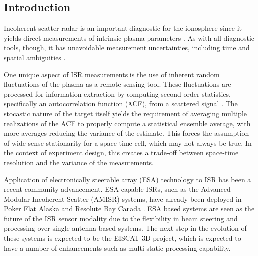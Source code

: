 \documentclass[draft,ras]{agutex}
\begin{document}
%
%

%

\begin{article}

\section{Introduction}
Incoherent scatter radar is an important diagnostic for the ionosphere since it yields direct measurements of intrinsic plasma parameters  \citep{dougherty:farley1960, farleydougherty:ISR2, doughteryfarley:ISR3, hagfors1961}. As with all diagnostic tools, though, it has unavoidable measurement uncertainties, including time and spatial ambiguities \citep{farley1969, farleycomppower1969, hysell2008, RDS:RDS20236}.  

One unique aspect of ISR measurements is the use of inherent random fluctuations of the plasma as a remote sensing tool. These fluctuations are processed for information extraction by computing second order statistics, specifically an autocorrelation function (ACF), from a scattered signal \citep{farley1969}. The stocastic nature of the target itself yields the requirement of averaging multiple realizations of the ACF to properly compute a statistical ensemble average, with more averages reducing the variance of the estimate. This forces the assumption of wide-sense stationarity for a space-time cell, which may not always be true. In the context of experiment design, this creates a trade-off between space-time resolution and the variance of the measurements.

Application of electronically steerable array (ESA) technology to ISR has been a recent community advancement. ESA capable ISRs, such as the Advanced Modular Incoherent Scatter (AMISR) systems, have already been deployed in Poker Flat Alaska and Resolute Bay Canada \citep{Nicolls:2007ie, dahlgren2012di}. ESA based systems are seen as the future of the ISR sensor modality due to the flexibility in beam steering and processing over single antenna based systems. The next step in the evolution of these systems is expected to be the EISCAT-3D project, which is expected to have a number of enhancements such as multi-static processing capability.


\end{article}
\end{document}
